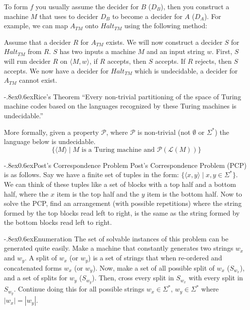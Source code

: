 \documentclass[10pt,landscape]{article}
\makeatletter
\renewcommand{\section}{\@startsection{section}{1}{0pt}%
                        {-.8ex}{0.6ex}{\normalfont\large\bfseries}}
\renewcommand{\subsection}{\@startsection{subsection}{2}{0pt}%
                           {-.8ex}{0.6ex}{\normalfont\normalsize\bfseries}}
\newcommand{\spbar}{\;|\;}
\newcommand{\langof}{\mathcal{L}}
\newcommand{\property}{\mathcal{P}}
\makeatother
\begin{document}
\begin{multicols*}{3}
To form $f$ you usually assume the decider for $B$ ($D_B$), then you construct
a machine $M$ that uses to decider $D_B$ to become a decider for $A$ ($D_A$).
For example, we can map $A_{TM}$ onto $Halt_{TM}$ using the following method:

Assume that a decider $R$ for $A_{TM}$ exists. We will now construct
a decider $S$ for $Halt_{TM}$ from $R$. $S$ has two inputs a machine $M$ and
an input string $w$. First, $S$ will run decider $R$ on $\langle M, w\rangle$,
if $R$ accepts, then $S$ accepts. If $R$ rejects, then $S$ accepts. We
now have a decider for $Halt_{TM}$ which is undecidable, a decider for
$A_{TM}$ cannot exist.

\subsection{Rice's Theorem}
``Every non-trivial partitioning of the space of Turing machine 
codes based on the languages recognized by these Turing machines 
is undecidable.''

More formally, given a property $\property$, where $\property$ is
non-trivial (not $\emptyset$ or $\Sigma^*$) the language below is
undecidable.
\[
    \{\langle M \rangle \spbar M \text{ is a Turing machine and } 
        \property(\langof(M))\}
\]

\section{Post's Correspondence Problem}
Post's Correspondence Problem (PCP) is as follows. Say we have a finite set of
tuples in the form: $\{\langle x, y \rangle \spbar x, y \in \Sigma^*\}$. We can think
of these tuples like a set of blocks with a top half and a bottom half, where
the $x$ item is the top half and the $y$ item is the bottom half. Now to 
solve the PCP, find an arrangement (with possible repetitions) where the
string formed by the top blocks read left to right, is the same as the string
formed by the bottom blocks read left to right.

\subsection{Enumeration}
The set of solvable instances of this problem can be generated quite easily.
Make a machine that constantly generates two strings $w_x$ and $w_y$. A split
of $w_x$ (or $w_y$) is a set of strings that when re-ordered and concatenated forms
$w_x$ (or $w_y$). Now, make a set of all possible split of $w_x$ ($S_{w_x}$), and a set of
splits for $w_y$ ($S_{w_y}$). Then, cross every split in $S_{w_x}$  with every split
in $S_{w_y}$. Continue doing this for all possible strings 
$w_x \in \Sigma^*$, $w_y \in \Sigma^*$ where $|w_x| = |w_y|$.


\end{multicols*}
\end{document}
